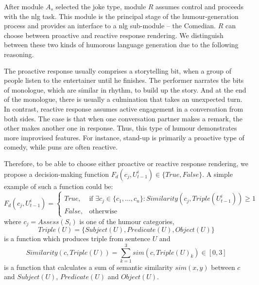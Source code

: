 After module \( A_s\) selected the joke type, module \( R\) assumes control and proceeds with the \acrfull{nlg} task. This module is the principal stage of the humour-generation process and provides an interface to a \acrlong{nlg} sub-module – the Comedian. \( R\) can choose between proactive and reactive response rendering. We distinguish between these two kinds of humorous language generation due to the following reasoning. \par

The proactive response usually comprises a storytelling bit, when a group of people listen to the entertainer until he finishes. The performer narrates the bits of monologue, which are similar in rhythm, to build up the story. And at the end of the monologue, there is usually a culmination that takes an unexpected turn. In contrast, reactive response assumes active engagement in a conversation from both sides. The case is that when one conversation partner makes a remark, the other makes another one in response. Thus, this type of humour demonstrates more improvised features. For instance, stand-up is primarily a proactive type of comedy, while puns are often reactive. \par

Therefore, to be able to choose either proactive or reactive response rendering, we propose a decision-making function \( F_d(c_j, U_{t-1}^i) \in \{True, False\}\). A simple example of such a function could be:
$$
F_d(c_j, U_{t-1}^i)=
    \begin{cases}
        True, & \text{if $\exists c_j \in \{c_1, ..., c_n\}: Similarity(c_j, Triple(U_{t-1}^i)) \geq 1$}\\
        False, & \text{otherwise}
    \end{cases}
$$
where \( c_j=Assess(S_i)\) is one of the humour categories, 
\[ Triple(U)=\{Subject(U), Predicate(U), Object(U)\}\] 
is a function which produces triple from sentence \( U\) and 
$$ 
Similarity(c, Triple(U))= \sum_{k=1}^{3} sim(c, Triple(U)_k) \in [0, 3]
$$
is a function that calculates a sum of semantic similarity \(sim(x, y)\) between \( c\) and \( Subject(U)\), \( Predicate(U)\) and \( Object(U)\). \par

